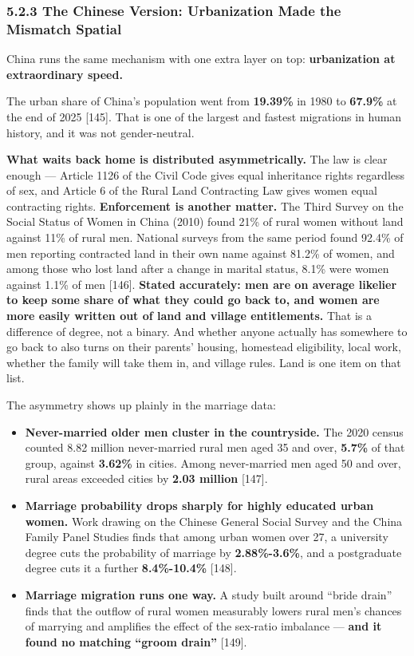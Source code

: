 \documentclass[11pt,a4paper]{article}
\begin{document}
\subsubsection{5.2.3 The Chinese Version: Urbanization Made the Mismatch Spatial}

China runs the same mechanism with one extra layer on top: \textbf{urbanization at extraordinary speed.}

The urban share of China's population went from \textbf{19.39\%} in 1980 to \textbf{67.9\%} at the end of 2025 [145]. That is one of the largest and fastest migrations in human history, and it was not gender-neutral.

\textbf{What waits back home is distributed asymmetrically.} The law is clear enough --- Article 1126 of the Civil Code gives equal inheritance rights regardless of sex, and Article 6 of the Rural Land Contracting Law gives women equal contracting rights. \textbf{Enforcement is another matter.} The Third Survey on the Social Status of Women in China (2010) found 21\% of rural women without land against 11\% of rural men. National surveys from the same period found 92.4\% of men reporting contracted land in their own name against 81.2\% of women, and among those who lost land after a change in marital status, 8.1\% were women against 1.1\% of men [146]. \textbf{Stated accurately: men are on average likelier to keep some share of what they could go back to, and women are more easily written out of land and village entitlements.} That is a difference of degree, not a binary. And whether anyone actually has somewhere to go back to also turns on their parents' housing, homestead eligibility, local work, whether the family will take them in, and village rules. Land is one item on that list.

The asymmetry shows up plainly in the marriage data:

\begin{itemize}
  \item \textbf{Never-married older men cluster in the countryside.} The 2020 census counted 8.82 million never-married rural men aged 35 and over, \textbf{5.7\%} of that group, against \textbf{3.62\%} in cities. Among never-married men aged 50 and over, rural areas exceeded cities by \textbf{2.03 million}{} [147].
  \item \textbf{Marriage probability drops sharply for highly educated urban women.} Work drawing on the Chinese General Social Survey and the China Family Panel Studies finds that among urban women over 27, a university degree cuts the probability of marriage by \textbf{2.88\%-3.6\%}, and a postgraduate degree cuts it a further \textbf{8.4\%-10.4\%}{} [148].
  \item \textbf{Marriage migration runs one way.} A study built around ``bride drain'' finds that the outflow of rural women measurably lowers rural men's chances of marrying and amplifies the effect of the sex-ratio imbalance --- \textbf{and it found no matching ``groom drain''}{} [149].
\end{itemize}
\end{document}

